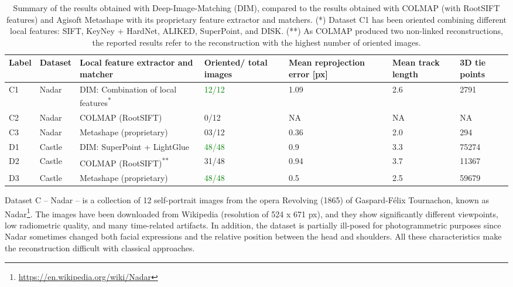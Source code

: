 \begin{table}[ht]
    \centering
    \caption{Summary of the results obtained with Deep-Image-Matching (DIM), compared to the results obtained with COLMAP (with RootSIFT features) and Agisoft Metashape with its proprietary feature extractor and matchers. (*) Dataset C1 has been oriented combining different local features: SIFT, KeyNey + HardNet, ALIKED, SuperPoint, and DISK.  (**) As COLMAP produced two non-linked reconstructions, the reported results refer to the reconstruction with the highest number of oriented images.} 
    \label{tab:5:statistics_summary}
    
    \begin{tabular}{l p{1cm} p{4cm} p{1.5cm} p{1.5cm} p{1.5cm} p{1.5cm}}
    \toprule
    \textbf{Label} & \textbf{Dataset} & \textbf{Local feature extractor and matcher} & \textbf{Oriented/} \newline\textbf{total images} & \textbf{Mean reprojection error [px]} & \textbf{Mean track length} &  \textbf{3D tie points}\\
    \midrule
    C1  & Nadar     & DIM: Combination of local features\textsuperscript{*}    & \textcolor{green}{12/12}     & 1.09  & 2.6   & 2791 \\
    C2  & Nadar     & COLMAP (RootSIFT)                     & 0/12      & NA    & NA    & NA   \\
    C3  & Nadar     & Metashape (proprietary)               & 03/12     & 0.36  & 2.0   & 294  \\ \hline
    D1  & Castle    & DIM: SuperPoint + LightGlue           & \textcolor{green}{48/48}     & 0.9   & 3.3   & 75274 \\
    D2  & Castle    & COLMAP (RootSIFT)\textsuperscript{**} & 31/48     & 0.94  & 3.7   & 11367 \\
    D3  & Castle    & Metashape (proprietary)               & \textcolor{green}{48/48}     & 0.5   & 2.5   & 59679 \\ 
    \bottomrule
    \end{tabular}
\end{table}

Dataset C – Nadar – is a collection of 12 self-portrait images from the opera Revolving (1865) of Gaspard-Félix Tournachon, known as Nadar\footnote{\url{https://en.wikipedia.org/wiki/Nadar}}. 
The images have been downloaded from Wikipedia (resolution of 524 x 671 px), and they show significantly different viewpoints, low radiometric quality, and many time-related artifacts. 
In addition, the dataset is partially ill-posed for photogrammetric purposes since Nadar sometimes changed both facial expressions and the relative position between the head and shoulders. 
All these characteristics make the reconstruction difficult with classical approaches.


